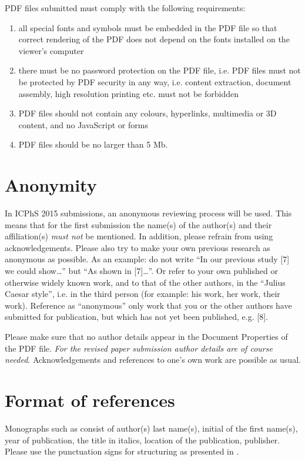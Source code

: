 \documentclass[a4paper,11pt,twocolumn]{article}
\begin{document}
PDF files submitted must comply with the following requirements:

\begin{enumerate}
\item all special fonts and symbols must be embedded in the PDF
  file so that correct rendering of the PDF does not depend on the
  fonts installed on the viewer's computer
\item there must be no
  password protection on the PDF file, i.e. PDF files must not be
  protected by PDF security in any way, i.e. content extraction,
  document assembly, high resolution printing etc. must not be
  forbidden
\item PDF files should not contain any colours, hyperlinks,
  multimedia or 3D content, and no JavaScript or forms
\item PDF files
  should be no larger than 5 Mb.
\end{enumerate}
\section{Anonymity}

In ICPhS 2015 submissions, an anonymous reviewing process will be used. This means that for the first submission the name(s) of the author(s) and
their affiliation(s) \emph{must not} be mentioned. In addition, please refrain from using acknowledgements.  Please also try to make your own previous research as anonymous as possible. As an example: do not write ``In our previous study [7] we could show\ldots'' but ``As shown in [7]\ldots''. Or refer to your own published or otherwise widely known work, and to that of the other authors, in the ``Julius Caesar style'', i.e. in the third person (for example: his work, her work, their work). Reference as ``anonymous'' only work that you or the other authors have submitted for publication, but which has not yet been published, e.g. [8].

Please make sure that no author details appear in the Document Properties of the PDF file. \emph{For the revised paper submission author details are of course needed}. Acknowledgements and references to one's own work are possible as usual.

\section{Format of references}

Monographs such as \cite{Fant:1960} consist of author(s) last name(s),
initial of the first name(s), year of publication, the title in
italics, location of the publication, publisher. Please use the
punctuation signs for structuring as presented in \cite{Fant:1960}.
\end{document}
